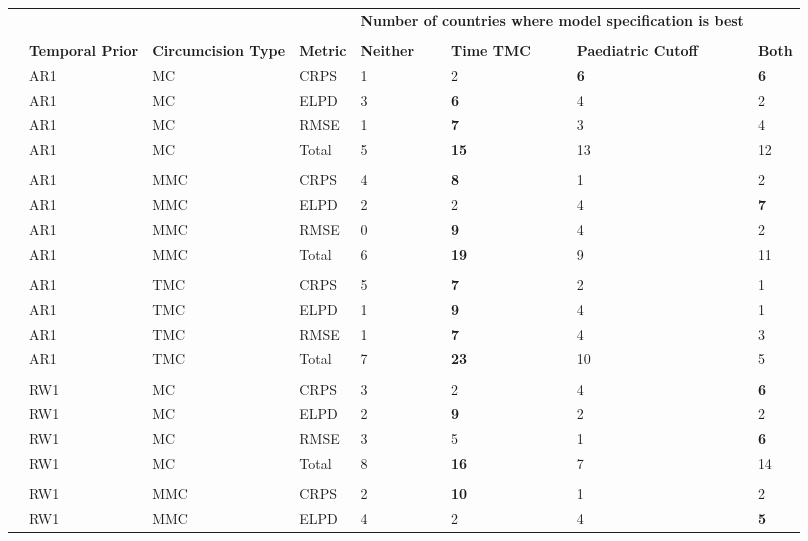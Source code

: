\documentclass{article}
\begin{document}
{\linespread{1}
  \footnotesize 
\begin{longtable}[c]{llllllll}
        \hline
        & & & & \multicolumn{3}{c}{\bf Number of countries where model specification is best}\\
        \cmidrule{5-8} \\
        & {\bf Temporal Prior} & {\bf Circumcision Type} & {\bf Metric}  & {\bf Neither} & {\bf Time TMC} & {\bf Paediatric Cutoff} & {\bf Both} \\[5pt]
        \midrule
        & AR1 & MC & CRPS & 1 & 2 & \bf{6} & \bf{6} \\ 
        & AR1 & MC & ELPD & 3 & \bf{6} & 4 & 2 \\ 
        & AR1 & MC & RMSE & 1 & \bf{7} & 3 & 4 \\ 
        \hline 
        & AR1 & MC & Total & 5 & \bf{15} & 13 & 12 \\ 
        \hline \\ 
        & AR1 & MMC & CRPS & 4 & \bf{8} & 1 & 2 \\ 
        & AR1 & MMC & ELPD & 2 & 2 & 4 & \bf{7} \\ 
        & AR1 & MMC & RMSE & 0 & \bf{9} & 4 & 2 \\ 
        \hline 
        & AR1 & MMC & Total & 6 & \bf{19} & 9 & 11 \\ 
        \hline \\ 
        & AR1 & TMC & CRPS & 5 & \bf{7} & 2 & 1 \\ 
        & AR1 & TMC & ELPD & 1 & \bf{9} & 4 & 1 \\ 
        & AR1 & TMC & RMSE & 1 & \bf{7} & 4 & 3 \\ 
        \hline 
        & AR1 & TMC & Total & 7 & \bf{23} & 10 & 5 \\ 
        \hline \\ 
        & RW1 & MC & CRPS & 3 & 2 & 4 & \bf{6} \\ 
        & RW1 & MC & ELPD & 2 & \bf{9} & 2 & 2 \\ 
        & RW1 & MC & RMSE & 3 & 5 & 1 & \bf{6} \\ 
        \hline 
        & RW1 & MC & Total & 8 & \bf{16} & 7 & 14 \\ 
        \hline \\ 
        & RW1 & MMC & CRPS & 2 & \bf{10} & 1 & 2 \\ 
        & RW1 & MMC & ELPD & 4 & 2 & 4 & \bf{5} \\ 

\end{longtable}}
\end{document}

